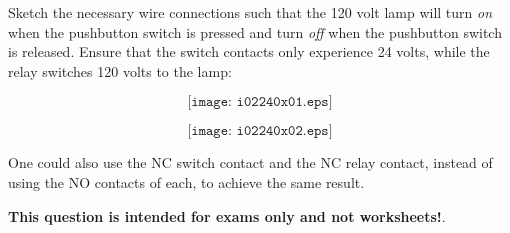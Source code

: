 
Sketch the necessary wire connections such that the 120 volt lamp will turn {\it on} when the pushbutton switch is pressed and turn {\it off} when the pushbutton switch is released.  Ensure that the switch contacts only experience 24 volts, while the relay switches 120 volts to the lamp:

$$\texttt{[image: i02240x01.eps]}$$







$$\texttt{[image: i02240x02.eps]}$$

One could also use the NC switch contact and the NC relay contact, instead of using the NO contacts of each, to achieve the same result.







{\bf This question is intended for exams only and not worksheets!}.



